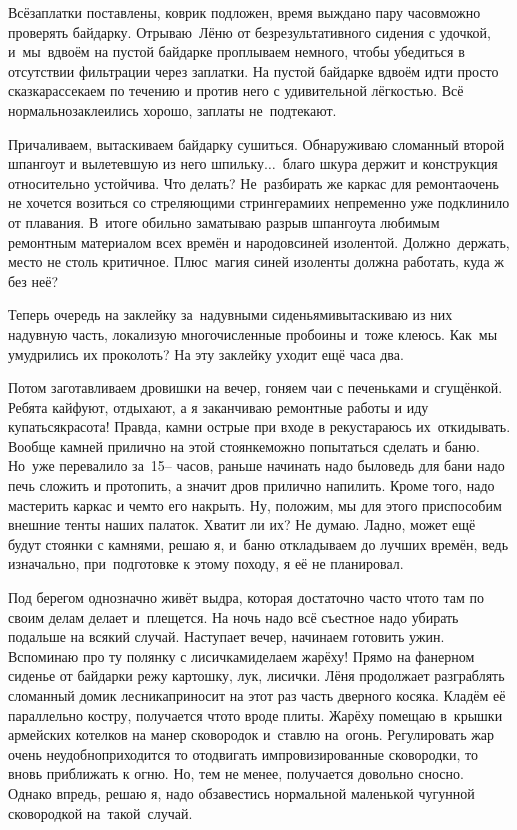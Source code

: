 Всё\mdash заплатки поставлены, коврик подложен, время выждано пару часов\mdash можно проверять байдарку. Отрываю~Лёню от безрезультативного сидения с удочкой, и~мы~вдвоём на пустой байдарке проплываем немного, чтобы убедиться в отсутствии фильтрации через заплатки. На пустой байдарке вдвоём идти просто сказка\mdash рассекаем по течению и против него с удивительной лёгкостью. Всё нормально\mdash заклеились хорошо, заплаты не~подтекают. 

Причаливаем, вытаскиваем байдарку сушиться. Обнаруживаю сломанный второй шпангоут и вылетевшую из него шпильку$\ldots$~благо шкура держит и конструкция относительно устойчива. Что делать? Не~разбирать же каркас для ремонта\mdash очень не хочется возиться со стреляющими стрингерами\mdash их непременно уже подклинило от плавания. В~итоге обильно заматываю разрыв шпангоута любимым ремонтным материалом всех времён и народов\mdash синей изолентой. Должно~держать, место не столь критичное. Плюс~магия синей изоленты должна работать, куда ж без неё? 

Теперь очередь на заклейку за~надувными сиденьями\mdash вытаскиваю из них надувную часть, локализую многочисленные пробоины и~тоже клеюсь. Как~мы умудрились их проколоть? На эту заклейку уходит ещё часа два. 

Потом заготавливаем дровишки на вечер, гоняем чаи с печеньками и сгущёнкой. Ребята кайфуют, отдыхают, а я заканчиваю ремонтные работы и иду купаться\mdash красота! Правда, камни острые при входе в реку\mdash стараюсь их~откидывать. Вообще камней прилично на этой стоянке\mdash можно попытаться сделать и баню. Но~уже перевалило за~{15\thinspace\nobreakdash--} часов, раньше начинать надо было\mdash ведь для бани надо печь сложить и протопить, а значит дров прилично напилить. Кроме того, надо мастерить каркас и чем\sdash то его накрыть. Ну, положим, мы для этого приспособим внешние тенты наших палаток. Хватит ли их? Не думаю. Ладно, может ещё будут стоянки с камнями, решаю я, и~баню откладываем до лучших времён, ведь изначально, при~подготовке к этому походу, я её не планировал.  

Под берегом однозначно живёт выдра, которая достаточно часто что\sdash то там по своим делам делает и~плещется. На ночь надо всё съестное надо убирать подальше на всякий случай. Наступает вечер, начинаем готовить ужин. Вспоминаю про ту полянку с лисичками\mdash делаем жарёху! Прямо на фанерном сиденье от байдарки режу картошку, лук, лисички. Лёня продолжает разграблять сломанный домик лесника\mdash приносит на этот раз часть дверного косяка. Кладём её параллельно костру, получается что\sdash то вроде плиты. Жарёху помещаю в~крышки армейских котелков на манер сковородок и~ставлю на~огонь. Регулировать жар очень неудобно\mdash приходится то отодвигать импровизированные сковородки, то вновь приближать к огню. Но, тем не менее, получается довольно сносно. Однако впредь, решаю я, надо обзавестись нормальной маленькой чугунной сковородкой на~такой~случай. 

